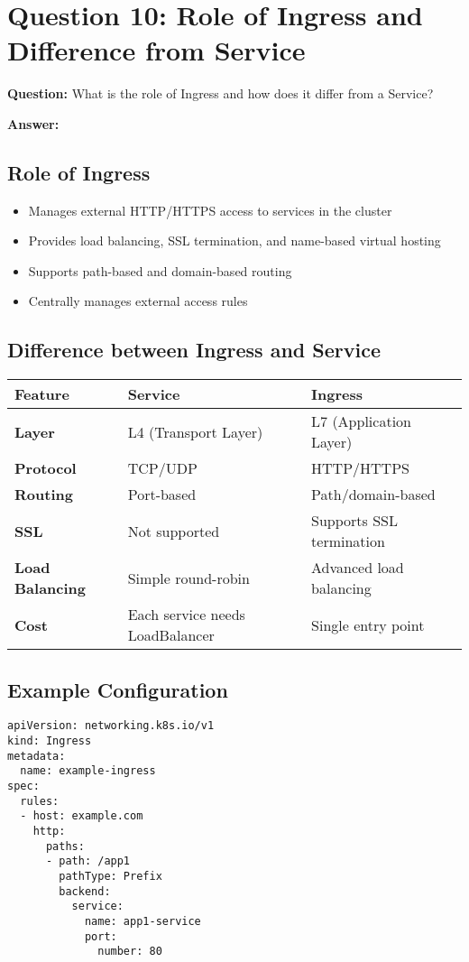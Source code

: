 \documentclass[12pt,a4paper]{article}
\begin{document}
\section{Question 10: Role of Ingress and Difference from Service}

\textbf{Question:} What is the role of Ingress and how does it differ from a Service?

\textbf{Answer:}

\subsection{Role of Ingress}
\begin{itemize}
    \item Manages external HTTP/HTTPS access to services in the cluster
    \item Provides load balancing, SSL termination, and name-based virtual hosting
    \item Supports path-based and domain-based routing
    \item Centrally manages external access rules
\end{itemize}

\subsection{Difference between Ingress and Service}

\begin{longtable}{|p{3cm}|p{5cm}|p{5cm}|}
\hline
\textbf{Feature} & \textbf{Service} & \textbf{Ingress} \\
\hline
\textbf{Layer} & L4 (Transport Layer) & L7 (Application Layer) \\
\hline
\textbf{Protocol} & TCP/UDP & HTTP/HTTPS \\
\hline
\textbf{Routing} & Port-based & Path/domain-based \\
\hline
\textbf{SSL} & Not supported & Supports SSL termination \\
\hline
\textbf{Load Balancing} & Simple round-robin & Advanced load balancing \\
\hline
\textbf{Cost} & Each service needs LoadBalancer & Single entry point \\
\hline
\end{longtable}

\subsection{Example Configuration}
\begin{lstlisting}
apiVersion: networking.k8s.io/v1
kind: Ingress
metadata:
  name: example-ingress
spec:
  rules:
  - host: example.com
    http:
      paths:
      - path: /app1
        pathType: Prefix
        backend:
          service:
            name: app1-service
            port:
              number: 80
\end{lstlisting}
\end{document}

